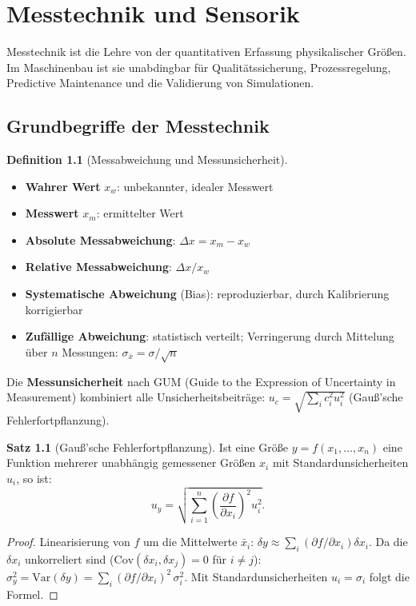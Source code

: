 ﻿\documentclass[a4paper,12pt]{report}
\theoremstyle{definition}
\newtheorem{definition}{Definition}
\newtheorem{satz}{Satz}
\begin{document}
\chapter{Messtechnik und Sensorik}

Messtechnik ist die Lehre von der quantitativen Erfassung physikalischer
Größen. Im Maschinenbau ist sie unabdingbar für Qualitätssicherung,
Prozessregelung, Predictive Maintenance und die Validierung von Simulationen.

\section{Grundbegriffe der Messtechnik}

\begin{definition}[Messabweichung und Messunsicherheit]
\begin{itemize}
    \item[-] \textbf{Wahrer Wert} $x_w$: unbekannter, idealer Messwert
    \item[-] \textbf{Messwert} $x_m$: ermittelter Wert
    \item[-] \textbf{Absolute Messabweichung}: $\Delta x = x_m - x_w$
    \item[-] \textbf{Relative Messabweichung}: $\Delta x / x_w$
    \item[-] \textbf{Systematische Abweichung} (Bias): reproduzierbar,
          durch Kalibrierung korrigierbar
    \item[-] \textbf{Zufällige Abweichung}: statistisch verteilt;
          Verringerung durch Mittelung über $n$ Messungen: $\sigma_{\bar{x}} = \sigma/\sqrt{n}$
\end{itemize}
Die \textbf{Messunsicherheit} nach GUM (Guide to the Expression of Uncertainty in Measurement)
kombiniert alle Unsicherheitsbeiträge:
$u_c = \sqrt{\sum_i c_i^2 u_i^2}$ (Gauß'sche Fehlerfortpflanzung).
\end{definition}

\begin{satz}[Gauß'sche Fehlerfortpflanzung]
Ist eine Größe $y = f(x_1, \ldots, x_n)$ eine Funktion mehrerer unabhängig
gemessener Größen $x_i$ mit Standardunsicherheiten $u_i$, so ist:
\[
  u_y = \sqrt{\sum_{i=1}^n \left(\frac{\partial f}{\partial x_i}\right)^2 u_i^2}.
\]
\end{satz}
\begin{proof}
Linearisierung von $f$ um die Mittelwerte $\bar{x}_i$:
$\delta y \approx \sum_i (\partial f/\partial x_i)\delta x_i$.
Da die $\delta x_i$ unkorreliert sind ($\mathrm{Cov}(\delta x_i, \delta x_j) = 0$ für $i\neq j$):
$\sigma_y^2 = \mathrm{Var}(\delta y) = \sum_i (\partial f/\partial x_i)^2\,\sigma_i^2$.
Mit Standardunsicherheiten $u_i = \sigma_i$ folgt die Formel.
\end{proof}
\end{document}
